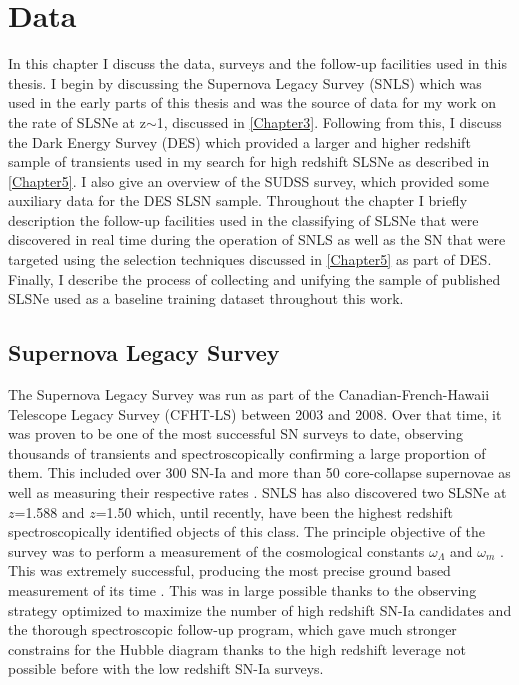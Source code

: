 \chapter{Data}
\label{Chapter2}

In this chapter I discuss the data, surveys and the follow-up facilities used in this thesis. I begin by discussing the Supernova Legacy Survey (SNLS) which was used in the early parts of this thesis and was the source of data for my work on the rate of SLSNe at z$\sim$1, discussed in \cref{Chapter3}. Following from this, I discuss the Dark Energy Survey (DES) which provided a larger and higher redshift sample of transients used in my search for high redshift SLSNe as described in \cref{Chapter5}. I also give an overview of the SUDSS survey, which provided some auxiliary data for the DES SLSN sample. Throughout the chapter I briefly description the follow-up facilities used in the classifying of SLSNe that were discovered in real time during the operation of SNLS as well as the SN that were targeted using the selection techniques discussed in \cref{Chapter5} as part of DES. Finally, I describe the process of collecting and unifying the sample of published SLSNe used as a baseline training dataset throughout this work.

\section{Supernova Legacy Survey}
The Supernova Legacy Survey \citep{Boulade2003,Pritchet2004} was run as part of the Canadian-French-Hawaii Telescope Legacy Survey (CFHT-LS) between 2003 and 2008. Over that time, it was proven to be one of the most successful SN surveys to date, observing thousands of transients and spectroscopically confirming a large proportion of them. This included over 300 SN-Ia \citep{Perrett2010} and more than 50 core-collapse supernovae as well as measuring their respective rates \citep{Perrett2012,Bazin2009}. SNLS has also discovered two SLSNe at $z$=1.588 and $z$=1.50 \citep{Howell2013} which, until recently, have been the highest redshift spectroscopically identified objects of this class. The principle objective of the survey was to perform a measurement of the cosmological constants $\omega_{\Lambda}$ and $\omega_{m}$ \citep{Astier2006}. This was extremely successful, producing the most precise ground based measurement of its time \citep{Sullivan2006}. This was in large possible thanks to the observing strategy optimized to maximize the number of high redshift SN-Ia candidates and the thorough spectroscopic follow-up program, which gave much stronger constrains for the Hubble diagram thanks to the high redshift leverage not possible before with the low redshift SN-Ia surveys.

